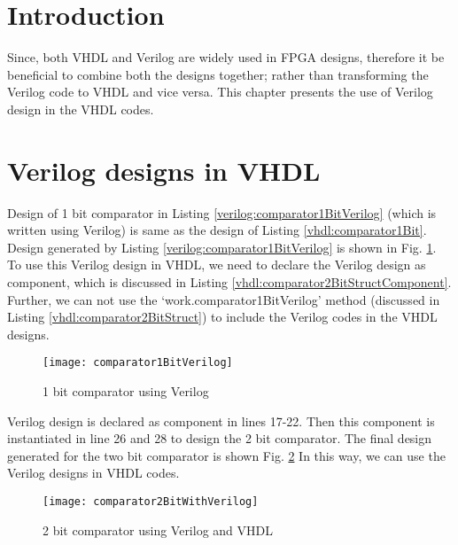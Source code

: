 \section{Introduction}
Since, both VHDL and Verilog are widely used in FPGA designs, therefore it be beneficial to combine both the designs together; rather than transforming the Verilog code to VHDL and vice versa. This chapter presents the use of Verilog design in the VHDL codes. 

\section{Verilog designs in VHDL}

Design of 1 bit comparator in Listing \ref{verilog:comparator1BitVerilog} (which is written using Verilog) is same as the design of Listing \ref{vhdl:comparator1Bit}. Design generated by Listing \ref{verilog:comparator1BitVerilog} is shown in Fig. \ref{fig:comparator1BitVerilog}. To use this Verilog design in VHDL, we need to declare the Verilog design as component, which is discussed in Listing \ref{vhdl:comparator2BitStructComponent}. Further, we can not use the `work.comparator1BitVerilog' method (discussed in Listing \ref{vhdl:comparator2BitStruct}) to include the Verilog codes in the VHDL designs. 


\begin{figure}[!h]
	\centering
	\texttt{[image: comparator1BitVerilog]}
	\caption{1 bit comparator using Verilog}
	\label{fig:comparator1BitVerilog}
\end{figure}

\begin{explanation}
	Verilog design is declared as component in lines 17-22. Then this component is instantiated in line 26 and 28 to design the 2 bit comparator. The final design generated for the two bit comparator is shown Fig. \ref{fig:comparator2BitWithVerilog} In this way, we can use the Verilog designs in VHDL codes. 
\end{explanation}


\begin{figure}[!h]
	\centering
	\texttt{[image: comparator2BitWithVerilog]}
	\caption{2 bit comparator using Verilog and VHDL}
	\label{fig:comparator2BitWithVerilog}
\end{figure}

